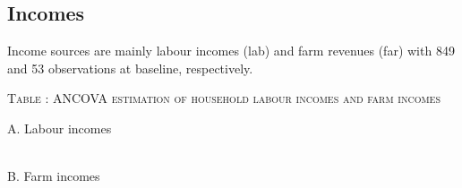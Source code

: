 \subsection{Incomes}


Income sources are mainly labour incomes (\textsf{lab}) and farm revenues (\textsf{far}) with 849 and 53 observations at baseline, respectively. 












\hspace{-1cm}\begin{minipage}[t]{14cm}
\hfil\textsc{\normalsize Table \thetable: ANCOVA estimation of household labour incomes and farm incomes\label{tab ANCOVA LabourIncomes}}\\
\setlength{\tabcolsep}{.5pt}
\setlength{\baselineskip}{8pt}
\renewcommand{\arraystretch}{.55}

\vspace{2ex}
A. Labour incomes\\
\hfil{}\\
B. Farm incomes\\
\hfil{}\\


\end{minipage}
